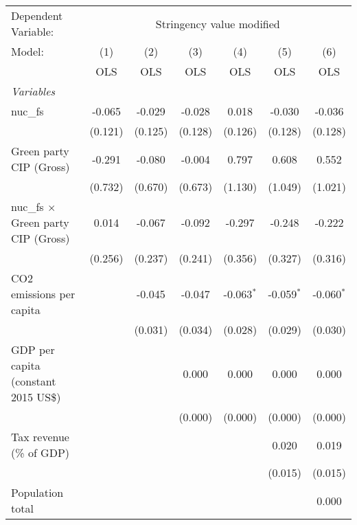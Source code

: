 
\begingroup
\centering
\begin{tabular}{lcccccc}
   \toprule
   Dependent Variable: & \multicolumn{6}{c}{Stringency value modified}\\
   Model:                                     & (1)     & (2)     & (3)     & (4)          & (5)          & (6)\\  
                                              &  OLS    & OLS     & OLS     & OLS          & OLS          & OLS\\  
   \midrule
   \emph{Variables}\\
   nuc\_fs                                    & -0.065  & -0.029  & -0.028  & 0.018        & -0.030       & -0.036\\   
                                              & (0.121) & (0.125) & (0.128) & (0.126)      & (0.128)      & (0.128)\\   
   Green party CIP (Gross)                    & -0.291  & -0.080  & -0.004  & 0.797        & 0.608        & 0.552\\   
                                              & (0.732) & (0.670) & (0.673) & (1.130)      & (1.049)      & (1.021)\\   
   nuc\_fs $\times$ Green party CIP (Gross)   & 0.014   & -0.067  & -0.092  & -0.297       & -0.248       & -0.222\\   
                                              & (0.256) & (0.237) & (0.241) & (0.356)      & (0.327)      & (0.316)\\   
   CO2 emissions per capita                   &         & -0.045  & -0.047  & -0.063$^{*}$ & -0.059$^{*}$ & -0.060$^{*}$\\   
                                              &         & (0.031) & (0.034) & (0.028)      & (0.029)      & (0.030)\\   
   GDP per capita (constant 2015 US\$)        &         &         & 0.000   & 0.000        & 0.000        & 0.000\\   
                                              &         &         & (0.000) & (0.000)      & (0.000)      & (0.000)\\   
   Tax revenue (\% of GDP)                    &         &         &         &              & 0.020        & 0.019\\   
                                              &         &         &         &              & (0.015)      & (0.015)\\   
   Population total                           &         &         &         &              &              & 0.000\\   

\end{tabular}
